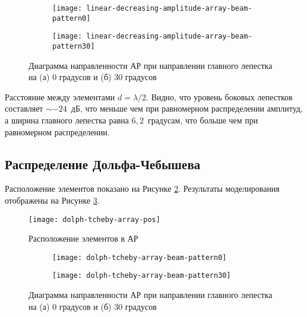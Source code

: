 \begin{figure}[!ht]
    \centering
    \begin{subfigure}[b]{0.49\textwidth}
        \centering
        \hspace*{-3ex}
        \texttt{[image: linear-decreasing-amplitude-array-beam-pattern0]}
        \caption{}%
    \end{subfigure}
    \hfill
    \begin{subfigure}[b]{0.49\textwidth}
        \centering
        \hspace*{-3ex}
        \texttt{[image: linear-decreasing-amplitude-array-beam-pattern30]}
        \caption{}%
    \end{subfigure}
    \caption{%
    Диаграмма направленности АР при направлении главного лепестка на (а) 0 градусов и (б) 30 градусов
    }%
    \label{fig:linear-decreasing-amplitude-array-modeling}
\end{figure}

Расстояние между элементами $d=\lambda/2$. Видно, что уровень боковых лепестков составляет $\sim-24$~дБ,
что меньше чем при равномерном распределении амплитуд,
а ширина главного лепестка равна $6,2$~градусам, что больше чем при равномерном распределении.

\subsection{Распределение Дольфа-Чебышева}

Расположение элементов показано на Рисунке \ref{fig:dolph-tcheby-array-pos}. Результаты моделирования отображены на Рисунке \ref{fig:dolph-tcheby-array-modeling}.

\begin{figure}[!ht]
    \centering
    \texttt{[image: dolph-tcheby-array-pos]}
    \caption{Расположение элементов в АР}
    \label{fig:dolph-tcheby-array-pos}
\end{figure}


\begin{figure}[!ht]
    \centering
    \begin{subfigure}[b]{0.49\textwidth}
        \centering
        \hspace*{-3ex}
        \texttt{[image: dolph-tcheby-array-beam-pattern0]}
        \caption{}%
    \end{subfigure}
    \hfill
    \begin{subfigure}[b]{0.49\textwidth}
        \centering
        \hspace*{-3ex}
        \texttt{[image: dolph-tcheby-array-beam-pattern30]}
        \caption{}%
    \end{subfigure}
    \caption{%
    Диаграмма направленности АР при направлении главного лепестка на (а) 0 градусов и (б) 30 градусов
    }%
    \label{fig:dolph-tcheby-array-modeling}
\end{figure}

